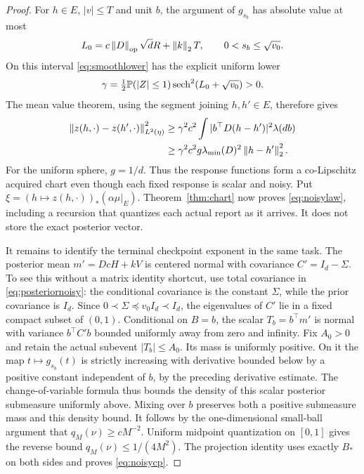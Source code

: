 \begin{proof}
For $h\in E$, $|v|\le T$ and unit $b$, the argument of $g_{s_b}$ has absolute value at most
\[
 L_0=c\left\lVert D\right\rVert_{\mathrm{op}}\sqrt d R+\left\lVert k\right\rVert_2T,
 \qquad 0<s_b\le\sqrt{v_0}.
\]
On this interval \eqref{eq:smoothlower} has the explicit uniform lower
\[
 \gamma=\tfrac12\mathbb P(|Z|\le1)
               \operatorname{sech}^2(L_0+\sqrt{v_0})>0.
\]
The mean value theorem, using the segment joining $h,h'\in E$, therefore gives
\begin{align*}
 \left\lVert z(h,\cdot)-z(h',\cdot)\right\rVert_{L^2(\eta)}^2
 &\ge\gamma^2 c^2\int |b^\top D(h-h')|^2\lambda(db)\\
 &\ge\gamma^2c^2g\lambda_{\min}(D)^2\left\lVert h-h'\right\rVert_2^2.
\end{align*}
For the uniform sphere, $g=1/d$. Thus the response functions form a co-Lipschitz acquired chart even though each fixed response is scalar and noisy. Put $\xi=(h\mapsto z(h,\cdot))_*(\alpha\mu|_E)$. Theorem~\ref{thm:chart} now proves \eqref{eq:noisylaw}, including a recursion that quantizes each actual report as it arrives. It does not store the exact posterior vector.

It remains to identify the terminal checkpoint exponent in the same task. The posterior mean $m'=D c H+kV$ is centered normal with covariance $C'=I_d-\Sigma$. To see this without a matrix identity shortcut, use total covariance in \eqref{eq:posteriornoisy}: the conditional covariance is the constant $\Sigma$, while the prior covariance is $I_d$. Since $0\prec\Sigma\preceq v_0I_d\prec I_d$, the eigenvalues of $C'$ lie in a fixed compact subset of $(0,1)$. Conditional on $B=b$, the scalar $T_b=b^\top m'$ is normal with variance $b^\top C'b$ bounded uniformly away from zero and infinity. Fix $A_0>0$ and retain the actual subevent $|T_b|\le A_0$. Its mass is uniformly positive. On it the map $t\mapsto g_{s_b}(t)$ is strictly increasing with derivative bounded below by a positive constant independent of $b$, by the preceding derivative estimate. The change-of-variable formula thus bounds the density of this scalar posterior submeasure uniformly above. Mixing over $b$ preserves both a positive submeasure mass and this density bound. It follows by the one-dimensional small-ball argument that $q_M(\nu)\ge cM^{-2}$. Uniform midpoint quantization on $[0,1]$ gives the reverse bound $q_M(\nu)\le1/(4M^2)$. The projection identity uses exactly $B_*$ on both sides and proves \eqref{eq:noisycp}.


\end{proof}
